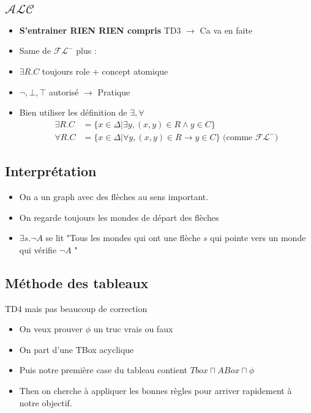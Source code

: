 \documentclass{article}
\theoremstyle{plain}%
\theoremstyle{definition}
\theoremstyle{remark}
\begin{document}
\subsection{$ \mathcal{ALC} $ }
\begin{itemize}
    \item \textbf{S'entrainer RIEN RIEN compris} TD3 $\rightarrow$ Ca va en faite
    \item Same de $ \mathcal{FL}^- $ plus : 
    \item $ \exists R.C $ toujours role + concept atomique 
    \item $ \neg , \bot , \top  $ autorisé $\rightarrow$ Pratique
    \item Bien utiliser les définition de $ \exists , \forall  $ \begin{align*}
        \exists R.C &= \{x \in \Delta | \exists y, (x,y) \in R \wedge y \in C\} \\
        \forall R.C &= \{x \in \Delta | \forall y, (x,y) \in R \to y \in C\} \text{ (comme } \mathcal{FL}^- \text{)}
    \end{align*}
\end{itemize}

\subsection{Interprétation}
\begin{itemize}
    \item On a un graph avec des flèches au sens important.
    \item On regarde toujours les mondes de départ des flèches
    \item $ \exists s. \neg A $ se lit "Tous les mondes qui ont une flèche $ s $ qui pointe vers un monde qui vérifie $ \neg A $ "
\end{itemize}

\subsection{Méthode des tableaux}
TD4 mais pas beaucoup de correction
\begin{itemize}
    \item On veux prouver $ \phi  $  un truc vrais ou faux
    \item On part d'une TBox acyclique
    \item Puis notre première case du tableau contient $ Tbox \sqcap ABox \sqcap \phi  $ 
    \item Then on cherche à appliquer les bonnes règles pour arriver rapidement à notre objectif.
\end{itemize}
\end{document}
